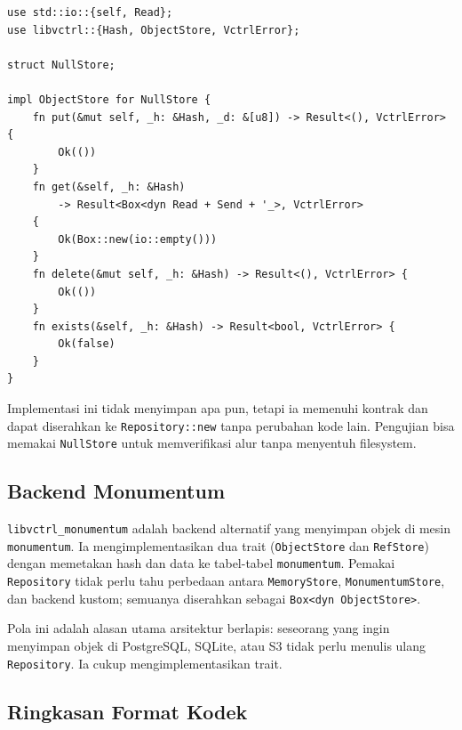 \documentclass[11pt,a4paper]{article}
\begin{document}
\begin{lstlisting}[style=code]
use std::io::{self, Read};
use libvctrl::{Hash, ObjectStore, VctrlError};

struct NullStore;

impl ObjectStore for NullStore {
    fn put(&mut self, _h: &Hash, _d: &[u8]) -> Result<(), VctrlError> {
        Ok(())
    }
    fn get(&self, _h: &Hash)
        -> Result<Box<dyn Read + Send + '_>, VctrlError>
    {
        Ok(Box::new(io::empty()))
    }
    fn delete(&mut self, _h: &Hash) -> Result<(), VctrlError> {
        Ok(())
    }
    fn exists(&self, _h: &Hash) -> Result<bool, VctrlError> {
        Ok(false)
    }
}
\end{lstlisting}

Implementasi ini tidak menyimpan apa pun, tetapi ia memenuhi kontrak dan dapat diserahkan ke \texttt{Repository::new} tanpa perubahan kode lain. Pengujian bisa memakai \texttt{NullStore} untuk memverifikasi alur tanpa menyentuh filesystem.

\subsection{Backend Monumentum}

\texttt{libvctrl\_monumentum} adalah backend alternatif yang menyimpan objek di mesin \texttt{monumentum}. Ia mengimplementasikan dua trait (\texttt{ObjectStore} dan \texttt{RefStore}) dengan memetakan hash dan data ke tabel-tabel \texttt{monumentum}. Pemakai \texttt{Repository} tidak perlu tahu perbedaan antara \texttt{MemoryStore}, \texttt{MonumentumStore}, dan backend kustom; semuanya diserahkan sebagai \texttt{Box<dyn ObjectStore>}.

Pola ini adalah alasan utama arsitektur berlapis: seseorang yang ingin menyimpan objek di PostgreSQL, SQLite, atau S3 tidak perlu menulis ulang \texttt{Repository}. Ia cukup mengimplementasikan trait.

\subsection{Ringkasan Format Kodek}
\end{document}
